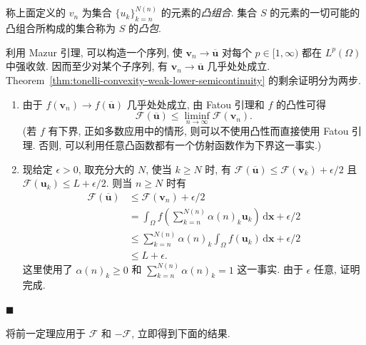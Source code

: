 \begin{Remark}
\label{rem:convex-combination-and-convex-hull}
称上面定义的 $v_n$ 为集合 $\{u_k\}_{k=n}^{N(n)}$ 的元素的\emph{凸组合}. 集合 $S$ 的元素的一切可能的凸组合所构成的集合称为 $S$ 的\emph{凸包}.
\end{Remark}

\begingroup
\renewenvironment{Proof}{\par}{\par\nobreak\hfill$\blacksquare$\par\vspace{0.1cm}}
\begin{Proof}
利用 Mazur 引理, 可以构造一个序列, 使 $\bm{v}_n\to\overline{\bm{u}}$ 对每个 $p\in[1,\infty)$ 都在 $L^p(\Omega)$ 中强收敛. 因而至少对某个子序列, 有 $\bm{v}_n\to\overline{\bm{u}}$ 几乎处处成立. Theorem~\ref{thm:tonelli-convexity-weak-lower-semicontinuity} 的剩余证明分为两步.\begin{enumerate}\item 由于 $f(\bm{v}_n)\to f(\overline{\bm{u}})$ 几乎处处成立, 由 Fatou 引理和 $f$ 的凸性可得
\begin{equation}\label{eq:tonelli-sufficiency-fatou-lower-bound}
\mathcal{F}(\overline{\bm{u}})\leq\liminf_{n\to\infty}\mathcal{F}(\bm{v}_n).
\end{equation}
(若 $f$ 有下界, 正如多数应用中的情形, 则可以不使用凸性而直接使用 Fatou 引理. 否则, 可以利用任意凸函数都有一个仿射函数作为下界这一事实.)\item 现给定 $\epsilon>0$, 取充分大的 $N$, 使当 $k\geq N$ 时, 有 $\mathcal{F}(\overline{\bm{u}})\leq\mathcal{F}(\bm{v}_k)+\epsilon/2$ 且 $\mathcal{F}(\bm{u}_k)\leq L+\epsilon/2$. 则当 $n\geq N$ 时有\[
\begin{aligned}
 \mathcal{F}(\overline{\bm{u}})&\leq\mathcal{F}(\bm{v}_n)+\epsilon/2\\
 &=\int_\Omega f\left(\sum_{k=n}^{N(n)}\alpha(n)_k\bm{u}_k\right)\,\mathrm{d}\bm{x}+\epsilon/2\\
 &\leq\sum_{k=n}^{N(n)}\alpha(n)_k\int_\Omega f(\bm{u}_k)\,\mathrm{d}\bm{x}+\epsilon/2\\
 &\leq L+\epsilon.
\end{aligned}
\]这里使用了 $\alpha(n)_k\geq0$ 和 $\sum_{k=n}^{N(n)}\alpha(n)_k=1$ 这一事实. 由于 $\epsilon$ 任意, 证明完成.\end{enumerate}
\end{Proof}
\endgroup

将前一定理应用于 $\mathcal{F}$ 和 $-\mathcal{F}$, 立即得到下面的结果.


